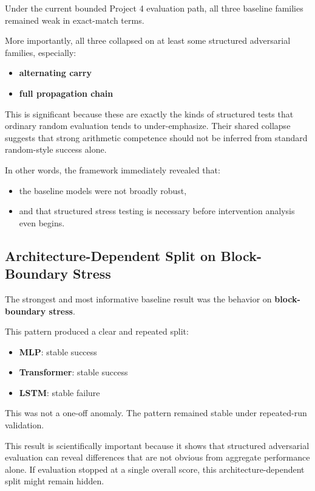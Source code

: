 \documentclass[11pt]{article}
\begin{document}
Under the current bounded Project 4 evaluation path, all three baseline families remained weak in exact-match terms.

More importantly, all three collapsed on at least some structured adversarial families, especially:
\begin{itemize}[leftmargin=1.5em]
    \item \textbf{alternating carry}
    \item \textbf{full propagation chain}
\end{itemize}

This is significant because these are exactly the kinds of structured tests that ordinary random evaluation tends to under-emphasize. Their shared collapse suggests that strong arithmetic competence should not be inferred from standard random-style success alone.

In other words, the framework immediately revealed that:
\begin{itemize}[leftmargin=1.5em]
    \item the baseline models were not broadly robust,
    \item and that structured stress testing is necessary before intervention analysis even begins.
\end{itemize}

\subsection{Architecture-Dependent Split on Block-Boundary Stress}

The strongest and most informative baseline result was the behavior on \textbf{block-boundary stress}.

This pattern produced a clear and repeated split:
\begin{itemize}[leftmargin=1.5em]
    \item \textbf{MLP}: stable success
    \item \textbf{Transformer}: stable success
    \item \textbf{LSTM}: stable failure
\end{itemize}

This was not a one-off anomaly. The pattern remained stable under repeated-run validation.

This result is scientifically important because it shows that structured adversarial evaluation can reveal differences that are not obvious from aggregate performance alone. If evaluation stopped at a single overall score, this architecture-dependent split might remain hidden.
\end{document}
